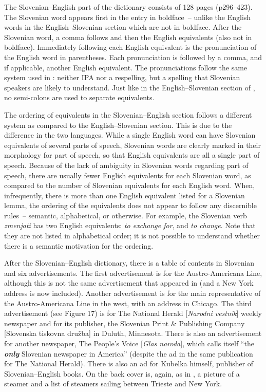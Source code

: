 \documentclass[output=paper,colorlinks,citecolor=brown,arabicfont,chinesefont]{langscibook}
\begin{document}
The Slovenian–English part of the dictionary consists of 128 pages (p296–423). The Slovenian word appears first in the entry in boldface~-- unlike the English words in the English–Slovenian section which are not in boldface. After the Slovenian word, a comma follows and then the English equivalents (also not in boldface). Immediately following each English equivalent is the pronunciation of the English word in parentheses. Each pronunciation is followed by a comma, and if applicable, another English equivalent. The pronunciations follow the same system used in \citet{Kubelka1904}: neither IPA nor a respelling, but a spelling that Slovenian speakers are likely to understand. Just like in the English–Slovenian section of \citet{Kubelka1912b}, no semi-colons are used to separate equivalents.

The ordering of equivalents in the Slovenian–English section follows a different system as compared to the English–Slovenian section. This is due to the difference in the two languages. While a single English word can have Slovenian equivalents of several parts of speech, Slovenian words are clearly marked in their morphology for part of speech, so that English equivalents are all a single part of speech. Because of the lack of ambiguity in Slovenian words regarding part of speech, there are usually fewer English equivalents for each Slovenian word, as compared to the number of Slovenian equivalents for each English word. When, infrequently, there is more than one English equivalent listed for a Slovenian lemma, the ordering of the equivalents does not appear to follow any discernible rules~-- semantic, alphabetical, or otherwise. For example, the Slovenian verb \emph{zmenjati} has two English equivalents: \emph{to exchange for}, and \emph{to change}. Note that they are not listed in alphabetical order; it is not possible to understand whether there is a semantic motivation for the ordering.

After the Slovenian–English dictionary, there is a table of contents in Slovenian and six advertisements. The first advertisement is for the Austro-Americana Line, although this is not the same advertisement that appeared in \citet{Kubelka1912a} (and a New York address is now included). Another advertisement is for the main representative of the Austro-Americana Line in the west, with an address in Chicago. The third advertisement (see Figure 17) is for The National Herald [\emph{Narodni vestnik}] weekly newspaper and for its publisher, the Slovenian Print \& Publishing Company [Slovenska tiskovna družba] in Duluth, Minnesota. There is also an advertisement for another newspaper, The People’s Voice [\emph{Glas naroda}], which calls itself “the \textbf{\emph{only}} Slovenian newspaper in America” (despite the ad in the same publication for The National Herald). There is also an ad for Kubelka himself, publisher of Slovenian–English books. On the back cover is, again, as in \citet{Kubelka1912a}, a picture of a steamer and a list of steamers sailing between Trieste and New York.
\end{document}
